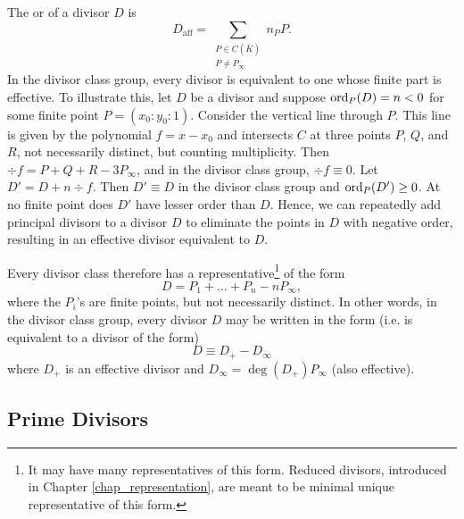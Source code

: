 The  or  of a divisor $D$ is
\[ D_{\text{aff}} = \sum_{\substack{P \in C(\bar K) \\ P \neq P_\infty}} n_P P. \]
In the divisor class group, every divisor is equivalent to one whose finite part is effective.
To illustrate this, let $D$ be a divisor and suppose $\operatorname{ord}_P(D) = n < 0$ for some finite point $P = (x_0 : y_0 : 1)$.
Consider the vertical line through $P$.
This line is given by the polynomial $f = x - x_0$ and intersects $C$ at three points $P$, $Q$, and $R$,
not necessarily distinct, but counting multiplicity.
Then $\div f = P + Q + R - 3P_\infty$, and in the divisor class group, $\div f \equiv 0$.
Let $D' = D + n \div f$.
Then $D' \equiv D$ in the divisor class group and $\operatorname{ord}_P(D') \geq 0$.
At no finite point does $D'$ have lesser order than $D$.
Hence, we can repeatedly add principal divisors to a divisor $D$
to eliminate the points in $D$ with negative order,
resulting in an effective divisor equivalent to $D$.

Every divisor class therefore has a representative\footnote{
It may have many representatives of this form.
Reduced divisors, introduced in Chapter \ref{chap_representation},
are meant to be minimal unique representative of this form.}
of the form
  \[ D = P_1 + \ldots + P_n - nP_\infty, \]
where the $P_i$'s are finite points, but not necessarily distinct.
In other words, in the divisor class group,
every divisor $D$ may be written in the form (i.e. is equivalent to a divisor of the form)
  \[ D \equiv D_+ - D_\infty \]
where $D_+$ is an effective divisor and $D_\infty = \deg(D_+)P_\infty$ (also effective).
\begin{comment}
Unless otherwise specified, we will assume that a divisor $D$ is of this form.
Since $D_\infty$ is determined uniquely by $D^+$,
we will furthermore drop the $D_\infty$ part and denote $D$ by its positive part only.
That is, if $D = P + Q + R - 3P_\infty$, we will instead write simply $D = P + Q + R$ and call $D$ a degree 3 divisor.
\end{comment}




\subsection{Prime Divisors}
\label{sec_prime_divisors}


